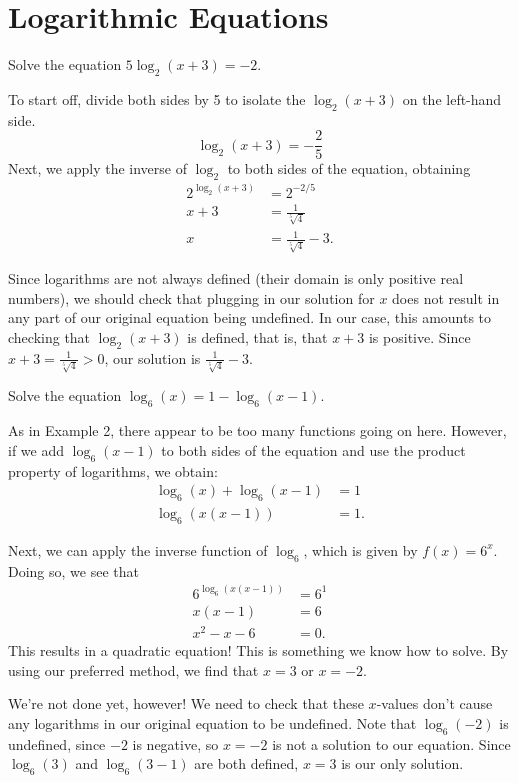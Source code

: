 \documentclass[nooutcomes]{ximera}
\begin{document}
\section{Logarithmic Equations}
\begin{example}
Solve the equation $5\log_2(x + 3) = -2$. 
\end{example}
\begin{explanation}
To start off, divide both sides by 5 to isolate the $\log_2(x + 3)$ on the left-hand side.
$$
\log_2(x + 3) = -\frac{2}{5}
$$
Next, we apply the inverse of $\log_2$ to both sides of the equation, obtaining
\begin{align*}
2^{\log_2(x + 3)} & = 2^{-2/5} \\
x + 3 & = \frac{1}{\sqrt[5]{4}} \\
x & = \frac{1}{\sqrt[5]{4}} - 3.
\end{align*}

Since logarithms are not always defined (their domain is only positive real numbers), we should check that plugging in our solution for $x$ does not result in any part of our original equation being undefined. In our case, this amounts to checking that $\log_2(x + 3)$ is defined, that is, that $x + 3$ is positive. Since $x + 3 = \frac{1}{\sqrt[5]{4}} > 0$, our solution is $\frac{1}{\sqrt[5]{4}} - 3$.
\end{explanation}

\begin{example}
Solve the equation $\log_6(x) = 1 - \log_6(x - 1)$.
\end{example}

\begin{explanation}
As in Example 2, there appear to be too many functions going on here. However, if we add $\log_6(x - 1)$ to both sides of the equation and use the product property of logarithms, we obtain:
\begin{align*}
\log_6(x) + \log_6(x - 1) & = 1 \\
\log_6(x(x - 1)) & = 1. 
\end{align*}

Next, we can apply the inverse function of $\log_6$, which is given by $f(x) = 6^x$. Doing so, we see that 
\begin{align*}
6^{\log_6(x(x - 1))} & = 6^1 \\
x(x - 1) & = 6 \\
x^2 - x - 6 & = 0.
\end{align*}
This results in a quadratic equation! This is something we know how to solve. By using our preferred method, we find that $x = 3$ or $x = -2$. 

We're not done yet, however! We need to check that these $x$-values don't cause any logarithms in our original equation to be undefined. Note that $\log_6(-2)$ is undefined, since $-2$ is negative, so $x = -2$ is not a solution to our equation. Since $\log_6(3)$ and $\log_6(3 - 1)$ are both defined, $x = 3$ is our only solution.
\end{explanation}
\end{document}
